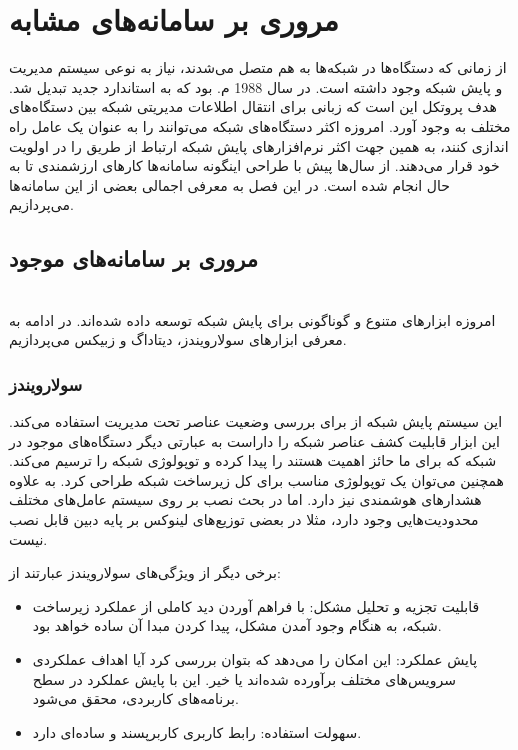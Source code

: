 \chapter{مروری بر سامانه‌های مشابه}

از زمانی که دستگاه‌ها در شبکه‌ها به هم متصل می‌شدند، نیاز به نوعی سیستم مدیریت و پایش شبکه وجود داشته است. در سال 1988 م. بود که  به استاندارد جدید تبدیل شد. هدف پروتکل  این است که زبانی برای انتقال اطلاعات مدیریتی شبکه بین دستگاه‌های مختلف به وجود آورد. امروزه اکثر دستگاه‌های شبکه می‌توانند  را به عنوان یک عامل راه اندازی کنند، به همین جهت اکثر نرم‌افزارهای پایش شبکه ارتباط از طریق  را در اولویت خود قرار می‌دهند.
از سال‌ها پیش با طراحی اینگونه سامانه‌ها کارهای ارزشمندی تا به حال انجام شده است. در این فصل به معرفی اجمالی بعضی از این سامانه‌ها می‌پردازیم.

\section{مروری بر سامانه‌های موجود}
\\
امروزه ابزارهای متنوع و گوناگونی برای پایش شبکه توسعه داده شده‌اند. در ادامه به معرفی ابزارهای سولارویندز، دیتاداگ و زبیکس می‌پردازیم.



\subsection{سولارویندز}

این سیستم پایش شبکه از  برای بررسی وضعیت عناصر تحت مدیریت استفاده می‌کند. این ابزار قابلیت کشف عناصر شبکه را داراست به عبارتی دیگر دستگاه‌های موجود در شبکه که برای ما حائز اهمیت هستند را پیدا کرده و توپولوژی شبکه را ترسیم می‌کند. همچنین می‌توان یک توپولوژی مناسب برای کل زیرساخت شبکه طراحی کرد. به علاوه هشدارهای هوشمندی نیز دارد. اما در بحث نصب بر روی سیستم‌ عامل‌های مختلف محدودیت‌هایی وجود دارد، مثلا در بعضی توزیع‌های لینوکس بر پایه دبین قابل نصب نیست.

\newpage


برخی دیگر از ویژگی‌های سولارویندز عبارتند از:

\begin{itemize}
    \item قابلیت تجزیه و تحلیل مشکل: با فراهم آوردن دید کاملی از عملکرد زیرساخت شبکه، به هنگام وجود آمدن مشکل، پیدا کردن مبدا آن ساده خواهد بود.
    \item پایش عملکرد: این امکان را می‌دهد که بتوان بررسی کرد آیا اهداف عملکردی سرویس‌های مختلف برآورده شده‌اند یا خیر. این با پایش عملکرد در سطح برنامه‌های کاربردی، محقق می‌شود.
    \item سهولت استفاده: رابط کاربری کاربرپسند و ساده‌ای دارد.
\end{itemize}



